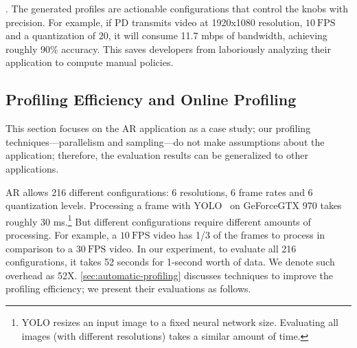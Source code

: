 . The generated profiles are actionable
configurations that control the knobs with precision. For example,
if PD transmits video at 1920x1080 resolution, \(10~\text{FPS}\) and
a quantization of 20, it will consume 11.7 mbps of bandwidth, achieving roughly
90\% accuracy. This saves developers from laboriously analyzing their
application to compute manual policies.

\subsection{Profiling Efficiency and Online Profiling}
\label{sec:online-profiling}

This section focuses on the AR application as a case study;
our profiling techniques---parallelism and sampling---do not make assumptions about the application; therefore, the evaluation results can be generalized to other applications.

AR allows 216 different configurations: 6 resolutions, 6 frame rates and 6
quantization levels. Processing a frame with YOLO~\cite{redmon2016yolo9000} on
GeForce\textregistered\space GTX 970 takes roughly 30 ms.\footnote{YOLO resizes
  an input image to a fixed neural network size. Evaluating all images (with
  different resolutions) takes a similar amount of time.} But different
configurations require different amounts of processing. For example, a \(10~\text{FPS}\)
video has 1/3 of the frames to process in comparison to a \(30~\text{FPS}\) video.
In our experiment, to evaluate all 216 configurations, it takes 52 seconds for 1-second
worth of data. We denote such overhead as 52X\@. \autoref{sec:automatic-profiling} discusses techniques to improve the
profiling efficiency; we present their evaluations as follows.


